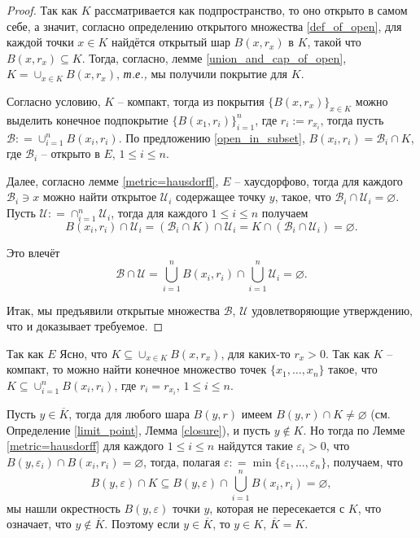 \begin{proof}
    Так как $K$ рассматривается как подпространство, то оно открыто в самом себе, а значит, согласно определению открытого множества \ref{def_of_open}, для каждой точки $x\in K$ найдётся открытый шар $B(x,r_x)$ в $K$, такой что $B(x,r_x) \subseteq K$. Тогда, согласно, лемме \ref{union_and_cap_of_open}, $K = \cup_{x \in K}B(x,r_x)$, \textit{т.е.,} мы получили покрытие для $K$.

    Согласно условию, $K$ -- компакт, тогда из покрытия $\{B(x,r_x)\}_{x\in K}$ можно выделить конечное подпокрытие $\{B(x_1, r_i)\}_{i=1}^n$, где $r_i:= r_{x_i}$, тогда пусть $\mathscr{B}: = \cup_{i=1}^n B(x_i,r_i)$. По предложению \ref{open_in_subset}, $B(x_i,r_i) = \mathscr{B}_i \cap K$, где $\mathscr{B}_i$ -- открыто в $E$, $1 \le i \le n$.

    Далее, согласно лемме \ref{metric=hausdorff}, $E$ -- хаусдорфово, тогда для каждого $\mathscr{B}_i \ni x$ можно найти открытое $\mathscr{U}_i$ содержащее точку $y$, такое, что $\mathscr{B}_i \cap \mathscr{U}_i = \varnothing$. Пусть $\mathscr{U}: = \cap_{i=1}^n \mathscr{U}_i$, тогда для каждого $1 \le i \le n$ получаем
   \[
    B(x_i,r_i) \cap \mathscr{U}_i = \left( \mathscr{B}_i \cap K \right) \cap \mathscr{U}_i = K \cap (\mathscr{B}_i \cap \mathscr{U}_i) = \varnothing.
   \]

   Это влечёт
   \[
    \mathscr{B} \cap \mathscr{U}= \bigcup_{i=1}^n B(x_i,r_i) \cap \bigcup_{i=1}^n \mathscr{U}_i = \varnothing.
   \]

   Итак, мы предъявили открытые множества $\mathscr{B}$, $\mathscr{U}$ удовлетворяющие утверждению, что и доказывает требуемое.
\end{proof}







Так как $E$ Ясно, что $K \subseteq \cup_{x \in K} B(x,r_x)$, для каких-то $r_x >0$. Так как $K$ -- компакт, то можно найти конечное множество точек $\{x_1,\ldots, x_n\}$ такое, что $K \subseteq \cup_{i=1}^n B(x_i, r_i)$, где $r_i = r_{x_i}$, $1\le i \le n.$

Пусть $y\in \overline{K}$, тогда для любого шара $B(y,r)$ имеем $B(y,r ) \cap K  \ne \varnothing$ (см. Определение \ref{limit_point}, Лемма \ref{closure}), и пусть $y\notin K$. Но тогда по Лемме \ref{metric=hausdorff} для каждого $1\le i \le n$ найдутся такие $\varepsilon_i>0$, что $B(y, \varepsilon_i) \cap B(x_i, r_i) = \varnothing$, тогда, полагая $\varepsilon: = \min \{\varepsilon_1, \ldots, \varepsilon_n\}$, получаем, что
\[
  B(y, \varepsilon) \cap K \subseteq B(y, \varepsilon) \cap \bigcup_{i=1}^n B(x_i,r_i) = \varnothing,
\]
\ie мы нашли окрестность $B(y, \varepsilon)$ точки $y$, которая не пересекается с $K$, что означает, что $y \notin \overline{K}$. Поэтому если $y\in \overline{K}$, то $y \in K$, \ie $\overline{K} = K.$

